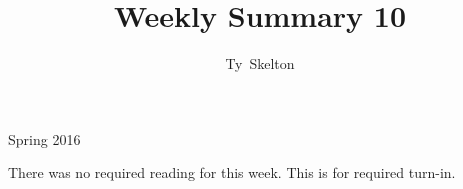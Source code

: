 \documentclass[10pt,draftclsnofoot,onecolumn]{IEEEtran}
\begin{document}
\singlespacing
\title{Weekly Summary 10}

\author{Ty~Skelton}

{Spring 2016}

\maketitle
\IEEEpeerreviewmaketitle

There was no required reading for this week.
This is for required turn-in.

\end{document}

